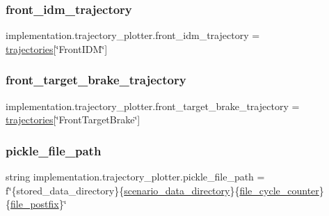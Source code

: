 \subsubsection{\texorpdfstring{front\+\_\+idm\+\_\+trajectory}{front\_idm\_trajectory}}
{\footnotesize\ttfamily implementation.\+trajectory\+\_\+plotter.\+front\+\_\+idm\+\_\+trajectory = \hyperlink{namespaceimplementation_1_1trajectory__plotter_a67e6bdba78400aff3229d099a95259fb}{trajectories}\mbox{[}\char`\"{}Front\+I\+DM\char`\"{}\mbox{]}}

\mbox{\label{namespaceimplementation_1_1trajectory__plotter_af6991a76275b979eba7ce26234f998ad}} 
\subsubsection{\texorpdfstring{front\+\_\+target\+\_\+brake\+\_\+trajectory}{front\_target\_brake\_trajectory}}
{\footnotesize\ttfamily implementation.\+trajectory\+\_\+plotter.\+front\+\_\+target\+\_\+brake\+\_\+trajectory = \hyperlink{namespaceimplementation_1_1trajectory__plotter_a67e6bdba78400aff3229d099a95259fb}{trajectories}\mbox{[}\char`\"{}Front\+Target\+Brake\char`\"{}\mbox{]}}

\mbox{\label{namespaceimplementation_1_1trajectory__plotter_a04d83f0f36286c497bf007c9308a4b95}} 
\subsubsection{\texorpdfstring{pickle\+\_\+file\+\_\+path}{pickle\_file\_path}}
{\footnotesize\ttfamily string implementation.\+trajectory\+\_\+plotter.\+pickle\+\_\+file\+\_\+path = f\char`\"{}\{stored\+\_\+data\+\_\+directory\}\{\hyperlink{namespaceimplementation_1_1trajectory__plotter_a8cd16ae40d4a9e36d8aa403f58180906}{scenario\+\_\+data\+\_\+directory}\}\{\hyperlink{namespaceimplementation_1_1trajectory__plotter_a230271bc03fa2b0dc367f3c14e161d39}{file\+\_\+cycle\+\_\+counter}\}\{\hyperlink{namespaceimplementation_1_1trajectory__plotter_a23f118bd7b214f9eb1baf44b98fb2312}{file\+\_\+postfix}\}\char`\"{}}

